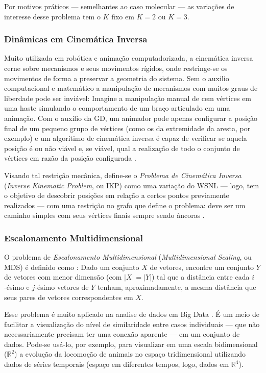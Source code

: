 \documentclass[a4paper,12pt]{article}
\begin{document}
Por motivos práticos --- semelhantes ao caso molecular --- as variações de interesse desse problema tem o $K$ fixo em $K= 2$ ou $K=3$.

\subsubsection{Dinâmicas em Cinemática Inversa}

Muito utilizada em robótica e animação computadorizada, a cinemática inversa cerne sobre mecanismos e seus movimentos rígidos, onde restringe-se os movimentos de forma a preservar a geometria do sistema. Sem o auxilio computacional e matemático a manipulação de mecanismos com muitos graus de liberdade  pode ser inviável: Imagine a manipulação manual de cem vértices em uma haste simulando o comportamento de um braço articulado em uma animação. Com o auxílio da GD, um animador pode apenas configurar a posição final de um pequeno grupo de vértices (como os da extremidade da aresta, por exemplo) e um algorítimo de cinemática inversa é capaz de verificar se aquela posição é ou não viável e, se viável, qual a realização de todo o conjunto de vértices em razão da posição configurada \cite{cinematicaInversa}.

Visando tal restrição mecânica, define-se o \textit{Problema de Cinemática Inversa} (\textit{Inverse Kinematic Problem}, ou IKP) como uma variação do WSNL --- logo, tem o objetivo de descobrir posições em relação a certos pontos previamente realizados --- com uma restrição no grafo que define o problema: deve ser um caminho simples com seus vértices finais sempre sendo âncoras \cite{carlileGDandAplications}.

\subsubsection{Escalonamento Multidimensional}

O problema de \textit{Escalonamento Multidimensional} (\textit{Multidimensional Scaling}, ou MDS)
é definido como \cite{carlileGDandAplications}: Dado um conjunto $X$ de vetores, encontre um conjunto $Y$ de vetores com menor dimensão (com $|X| = |Y|$) tal que a distância entre cada $i$-ésimo e $j$-ésimo vetores de $Y$ tenham, aproximadamente, a mesma distância que seus pares de vetores correspondentes em $X$.

Esse problema é muito aplicado na analise de dados em Big Data \cite{libertiEDG}. É um meio de facilitar a visualização do nível de similaridade entre casos individuais --- que não necessariamente precisam ter uma conexão aparente --- em um conjunto de dados. Pode-se usá-lo, por exemplo, para visualizar em uma escala bidimensional ($\mathbb{R}^2$) a evolução da locomoção de animais no espaço tridimensional utilizando dados de séries temporais (espaço em diferentes tempos, logo, dados em $\mathbb{R}^4$).
\end{document}
